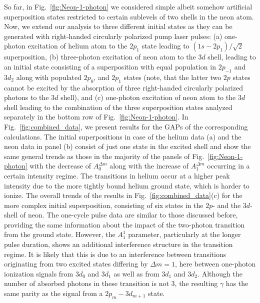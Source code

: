 So far, in Fig.~\ref{fig:Neon-1-photon} we considered simple albeit somehow artificial superposition states restricted to certain sublevels of two shells in the neon atom. Now, we extend our analysis to three different initial states as they can be generated with right-handed circularly polarized pump laser pulses: (a) one-photon excitation of helium atom to the $2p_1$ state leading to $(1s-2p_1)/\sqrt{2}$ superposition, (b) three-photon excitation of neon atom to the $3d$  shell, leading to an initial state consisting of a superposition with equal population in $2p_{-1}$ and $3d_2$ along with populated $2p_0$, and $2p_1$ states (note, that the latter two $2p$ states cannot be excited by the absorption of three right-handed circularly polarized photons to the $3d$ shell), and (c) one-photon excitation of neon atom to the $3d$ shell leading to the combination of the three superposition states analyzed separately in the bottom row of Fig.~\ref{fig:Neon-1-photon}.
In Fig.~\ref{fig:combined_data}, we present results for the GAPs of the corresponding calculations.
The initial superpositions in case of the helium data (a) and the neon data in panel (b) consist of just one state in the excited shell and show the same general trends as those in the majority of the panels of  Fig.~\ref{fig:Neon-1-photon} with the decrease of $A_0^{\Delta m}$ along with the increase of $A_1^{\Delta m}$ occurring in a certain  intensity regime. The transitions in helium occur at a higher peak intensity due to the more tightly bound helium ground state, which is harder to ionize.  
The overall trends of the results in Fig.~\ref{fig:combined_data}(c) for the more complex initial superposition, consisting of six states in the $2p$- and the $3d$-shell of neon.
The one-cycle pulse data are similar to those discussed before, providing the same information about the impact of the two-photon transition from the ground state. However, the $A_1^1$ parameter, particularly at the longer pulse duration, shows an additional interference structure in the transition regime. It is likely that this is due
to an interference between transitions originating from two excited states differing by $\Delta m = 1$, here between one-photon ionization signals
from $3d_0$ and $3d_1$ as well as from $3d_1$ and $3d_2$. Although the number of absorbed photons in these transition is not 3, the resulting $\gamma$ has the same parity as the signal from a $2p_m-3d_{m+1}$ state.

